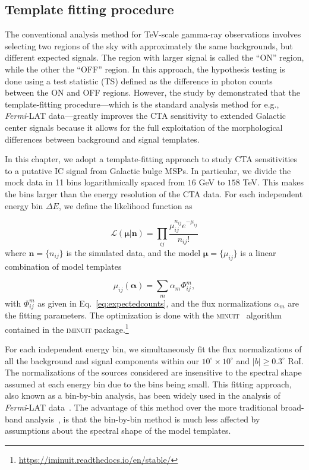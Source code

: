 \documentclass[doublespace,nopageskip]{VTthesis}
\begin{document}
\subsection{Template fitting procedure}
\label{sub:templatefitting}

The conventional analysis method for TeV-scale gamma-ray observations involves selecting two regions of the sky with approximately the same backgrounds, 
but different expected signals. The region with larger signal is called the ``ON'' region, while the other the ``OFF'' region. In this approach, the hypothesis testing is done using a test statistic (TS) defined as the difference in photon counts between the ON and OFF regions. However, the study by \cite{2015JCAP...03..055S} demonstrated that the template-fitting procedure---which is the standard analysis method for e.g., \textit{Fermi}-LAT data---greatly improves the CTA sensitivity to extended Galactic center signals because it allows for the full exploitation of the morphological differences between background and signal templates. 

In this chapter, we adopt a template-fitting approach to study CTA sensitivities to a putative IC signal from Galactic bulge MSPs. In particular, we divide the mock data in 11 bins logarithmically spaced from $16$ GeV to $158$ TeV. This makes the bins larger than the energy resolution of the CTA data. 
For each independent energy bin $\Delta E$, we define the likelihood function as   

\begin{equation}\label{eq:likelihoodfunc}
   \mathcal{L}(\boldsymbol{\mu}\lvert \boldsymbol{n}) = \prod_{ij}\frac{\mu_{ij}^{n_{ij}} e^{-\mu_{ij}}}{n_{ij}!}
\end{equation}
where $\boldsymbol{n}=\{n_{ij}\}$ is the simulated data, and the model $\boldsymbol{\mu}=\{\mu_{ij}\}$ is a linear combination of model templates

\begin{equation}\label{eq:superposition}
    \mu_{ij}(\boldsymbol{\alpha}) = \sum_{m} \alpha_{m} \Phi^m_{ij}, 
\end{equation}
with $\Phi^m_{ij}$ as given in Eq.~\ref{eq:expectedcounts}, and the flux normalizations $\alpha_m$ are the fitting parameters. The optimization is done with the \textsc{minuit}~\citep{Nelder:1965zz} algorithm contained in the \textsc{iminuit} package.\footnote{\url{https://iminuit.readthedocs.io/en/stable/}} 

For each independent energy bin, we simultaneously fit the flux normalizations of all the background and signal components within our $10^\circ \times 10^\circ$ and $|b|\geq 0.3^\circ$ RoI. The normalizations of the sources considered are insensitive to the spectral shape assumed at each energy bin due to the bins being small.  This fitting approach, also known as a bin-by-bin analysis, has been widely used in the analysis of \textit{Fermi}-LAT data~\cite[e.g.,][]{2015PhRvL.115w1301A}. The advantage of this method over the more traditional broad-band analysis~\citep[e.g.,][]{2021PhRvD.103b3011R,2021JCAP...01..057A}, is that the bin-by-bin method is much less affected by assumptions about the spectral shape of the model templates. 
\end{document}
